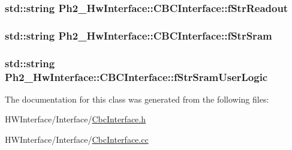 \hypertarget{class_ph2___hw_interface_1_1_c_b_c_interface_a1f52dd280bb04707d890526be58b56ba}{
\subsubsection[{f\-Str\-Readout}]{\setlength{\rightskip}{0pt plus 5cm}std\-::string Ph2\-\_\-\-Hw\-Interface\-::\-C\-B\-C\-Interface\-::f\-Str\-Readout\hspace{0.3cm}{\ttfamily [private]}}}\label{class_ph2___hw_interface_1_1_c_b_c_interface_a1f52dd280bb04707d890526be58b56ba}
\hypertarget{class_ph2___hw_interface_1_1_c_b_c_interface_a19496098840524d937006e847a82ab37}{
\subsubsection[{f\-Str\-Sram}]{\setlength{\rightskip}{0pt plus 5cm}std\-::string Ph2\-\_\-\-Hw\-Interface\-::\-C\-B\-C\-Interface\-::f\-Str\-Sram\hspace{0.3cm}{\ttfamily [private]}}}\label{class_ph2___hw_interface_1_1_c_b_c_interface_a19496098840524d937006e847a82ab37}
\hypertarget{class_ph2___hw_interface_1_1_c_b_c_interface_ac74f8185e2194b9697833c5307d031ea}{
\subsubsection[{f\-Str\-Sram\-User\-Logic}]{\setlength{\rightskip}{0pt plus 5cm}std\-::string Ph2\-\_\-\-Hw\-Interface\-::\-C\-B\-C\-Interface\-::f\-Str\-Sram\-User\-Logic\hspace{0.3cm}{\ttfamily [private]}}}\label{class_ph2___hw_interface_1_1_c_b_c_interface_ac74f8185e2194b9697833c5307d031ea}


The documentation for this class was generated from the following files\-:\begin{DoxyCompactItemize}
\item 
H\-W\-Interface/\-Interface/\hyperlink{_cbc_interface_8h}{Cbc\-Interface.\-h}\item 
H\-W\-Interface/\-Interface/\hyperlink{_cbc_interface_8cc}{Cbc\-Interface.\-cc}\end{DoxyCompactItemize}
